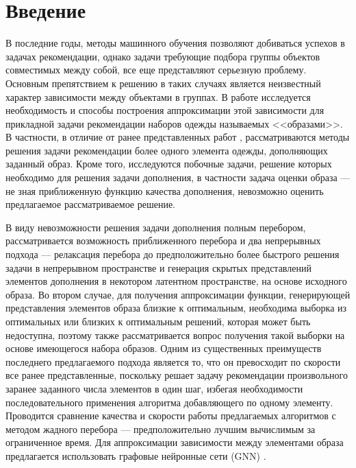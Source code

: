 \documentclass[a4paper,14pt]{extarticle}
\begin{document}
	\section{Введение}
		В последние годы, методы машинного обучения позволяют добиваться успехов в задачах рекомендации, однако задачи требующие подбора группы объектов совместимых между собой, все еще представляют серьезную проблему. Основным препятствием к решению в таких случаях является неизвестный характер зависимости между объектами в группах. В работе исследуется необходимость и способы построения аппроксимации этой зависимости для прикладной задачи рекомендации наборов одежды называемых <<образами>>. 
		В частности, в отличие от ранее представленных работ \cite{https://doi.org/10.48550/arXiv.1908.11754} \cite{https://doi.org/10.48550/arXiv.2005.12566}  \cite{https://doi.org/10.48550/arXiv.2204.04812}, рассматриваются методы решения задачи рекомендации более одного элемента одежды, дополняющих заданный образ. Кроме того, исследуются побочные задачи, решение которых необходимо для решения задачи дополнения, в частности задача оценки образа --- не зная приближенную функцию качества дополнения, невозможно оценить предлагаемое рассматриваемое решение.
		
		В виду невозможности решения задачи дополнения полным перебором, рассматривается возможность приближенного перебора и два непрерывных подхода --- релаксация перебора до предположительно более быстрого решения задачи в непрерывном пространстве и генерация скрытых представлений элементов дополнения в некотором латентном пространстве, на основе исходного образа. Во втором случае, для получения аппроксимации функции, генерирующей представления элементов образа близкие к оптимальным, необходима выборка из оптимальных или близких к оптимальным решений, которая может быть недоступна, поэтому также рассматривается вопрос получения такой выборки на основе имеющегося набора образов. Одним из существенных преимуществ последнего предлагаемого подхода является то, что он превосходит по скорости все ранее представленные, поскольку решает задачу рекомендации произвольного заранее заданного числа элементов в один шаг, избегая необходимости последовательного применения алгоритма добавляющего по одному элементу. Проводится сравнение качества и скорости работы предлагаемых алгоритмов с методом жадного перебора --- предположительно лучшим вычислимым за ограниченное время. 
		Для аппроксимации зависимости между элементами образа предлагается использовать графовые нейронные сети (GNN) \cite{scarselli2008graph}.
			
\end{document}
